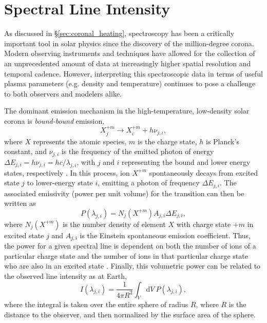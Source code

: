 \section{Spectral Line Intensity}
\label{sec:spectral_lines}
%
As discussed in \S\ref{sec:coronal_heating}, spectroscopy has been a critically important tool in solar physics since the discovery of the million-degree corona. Modern observing instruments and techniques have allowed for the collection of an unprecedented amount of data at increasingly higher spatial resolution and temporal cadence. However, interpreting this spectroscopic data in terms of useful plasma parameters (e.g. density and temperature) continues to pose a challenge to both observers and modelers alike.
%
\par The dominant emission mechanism in the high-temperature, low-density solar corona is \textit{bound-bound} emission,
\begin{equation}
	\label{eq:bound_bound}
	X_j^{+m}\to X_i^{+m} + h\nu_{j,i},
\end{equation}
where $X$ represents the atomic species, $m$ is the charge state, $h$ is Planck's constant, and $\nu_{j,i}$ is the frequency of the emitted photon of energy $\Delta E_{j,i} = h\nu_{j,i}=hc/\lambda_{j,i}$, with $j$ and $i$ representing the bound and lower energy states, respectively \citep{mason_spectroscopic_1994}. In this process, ion $X^{+m}$ spontaneously decays from excited state $j$ to lower-energy state $i$, emitting a photon of frequency $\Delta E_{j,i}$. The associated emissivity (power per unit volume) for the transition can then be written as 
\begin{equation}
	\label{eq:emissivity}
	P(\lambda_{j,i})=N_j(X^{+m})A_{j,i}\Delta E_{j,i},
\end{equation}
where $N_j(X^{+m})$ is the number density of element $X$ with charge state $+m$ in excited state $j$ and $A_{j,i}$ is the Einstein spontaneous emission coefficient. Thus, the power for a given spectral line is dependent on both the number of ions of a particular charge state and the number of ions in that particular charge state who are also in an excited state \citep{mason_spectroscopic_1994,bradshaw_collisional_2013}. Finally, this volumetric power can be related to the observed line intensity as at Earth,
\begin{equation}
	\label{eq:intensity}
	I(\lambda_{j,i}) = \frac{1}{4\pi R^2}\int_V \mathrm{d}V~P(\lambda_{j,i}),
\end{equation}
where the integral is taken over the entire sphere of radius $R$, where $R$ is the distance to the observer, and then normalized by the surface area of the sphere.
